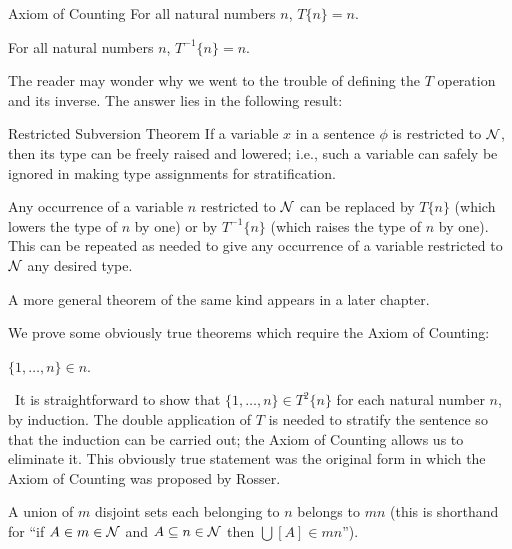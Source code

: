 \begin{axiom}{Axiom of Counting}
  For all natural numbers $n$, $T\{n\} = n$.
\end{axiom}

\begin{cor}
 For all natural numbers $n$, $T^{-1}\{n\} = n$.
\end{cor}

The reader may wonder why we went to the trouble of defining the $T$
operation and its inverse.  The answer lies in the following result:

\begin{Thm}{Restricted Subversion Theorem}
 If a variable $x$ in a sentence $\phi$ is restricted to $\cal N$, then its
 type can be freely raised and lowered; i.e., such a
 variable can safely be ignored in making type assignments for
 stratification.
\end{Thm}

\preuve Any occurrence of a variable $n$ restricted to $\cal N$ can be 
replaced by $T\{n\}$ (which lowers the type of $n$ by one) or by
$T^{-1}\{n\}$ (which raises the type of $n$ by one).  This can be
repeated as needed to give any occurrence of a variable restricted to
$\cal N$ any desired type.
\finpreuve

A more general theorem of the same kind appears in a later chapter.

We prove some obviously true theorems which require the Axiom of Counting:

\begin{thm}
 $\{1,\ldots,n\} \in n$.
\end{thm}

\preuve\ It is straightforward to show that $\{1,\ldots,n\} \in
T^2\{n\}$ for each natural number $n$, by
induction.  The double application of $T$ is
needed 
to stratify the sentence so that the 
induction can be carried out; the Axiom of Counting allows us to
eliminate it.  This obviously true statement was the original form in
which the Axiom of Counting was proposed by Rosser.
\finpreuve

\begin{thm}
 A union of $m$ disjoint sets each belonging
 to $n$ belongs to $mn$ (this is shorthand for ``if $A \in m \in {\cal N}$ and
 $A \subseteq n \in {\cal N}$ then $\bigcup[A] \in mn$'').
\end{thm}

